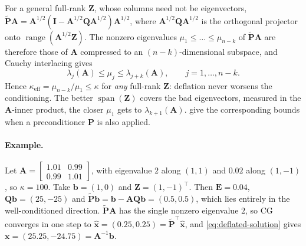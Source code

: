 For a general full-rank $\mathbf{Z}$, whose columns need not be eigenvectors,
$\tilde{\mathbf{P}}\mathbf{A} = \mathbf{A}^{1/2}(\mathbf{I} - \mathbf{A}^{1/2}\mathbf{Q}\mathbf{A}^{1/2})\mathbf{A}^{1/2}$,
where $\mathbf{A}^{1/2}\mathbf{Q}\mathbf{A}^{1/2}$ is the orthogonal projector
onto $\operatorname{range}(\mathbf{A}^{1/2}\mathbf{Z})$. The nonzero eigenvalues
$\mu_1 \le \dots \le \mu_{n-k}$ of $\tilde{\mathbf{P}}\mathbf{A}$ are therefore those of
$\mathbf{A}$ compressed to an $(n-k)$-dimensional subspace, and Cauchy
interlacing \citep{golub2013matrix} gives
\begin{equation}
  \lambda_j(\mathbf{A}) \le \mu_j \le \lambda_{j+k}(\mathbf{A}),
  \qquad j = 1, \dots, n-k .
  \label{eq:deflation-interlacing}
\end{equation}
Hence $\kappa_{\mathrm{eff}} = \mu_{n-k}/\mu_1 \le \kappa$ for \emph{any}
full-rank $\mathbf{Z}$: deflation never worsens the conditioning. The better
$\operatorname{span}(\mathbf{Z})$ covers the bad eigenvectors, measured in the
$\mathbf{A}$-inner product, the closer $\mu_1$ gets to $\lambda_{k+1}(\mathbf{A})$.
\citet{frank2001construction} give the corresponding bounds when a
preconditioner $\mathbf{P}$ is also applied.

\paragraph{Example.}
Let $\mathbf{A} = \begin{bmatrix} 1.01 & 0.99 \\ 0.99 & 1.01 \end{bmatrix}$,
with eigenvalue $2$ along $(1,1)$ and $0.02$ along $(1,-1)$, so $\kappa = 100$.
Take $\mathbf{b} = (1, 0)$ and $\mathbf{Z} = (1, -1)^\top$. Then
$\mathbf{E} = 0.04$, $\mathbf{Q}\mathbf{b} = (25, -25)$ and
$\tilde{\mathbf{P}}\mathbf{b} = \mathbf{b} - \mathbf{A}\mathbf{Q}\mathbf{b} = (0.5, 0.5)$,
which lies entirely in the well-conditioned direction. $\tilde{\mathbf{P}}\mathbf{A}$
has the single nonzero eigenvalue $2$, so CG converges in one step to
$\hat{\mathbf{x}} = (0.25, 0.25) = \tilde{\mathbf{P}}^\top\hat{\mathbf{x}}$, and
\eqref{eq:deflated-solution} gives $\mathbf{x} = (25.25, -24.75) = \mathbf{A}^{-1}\mathbf{b}$.

